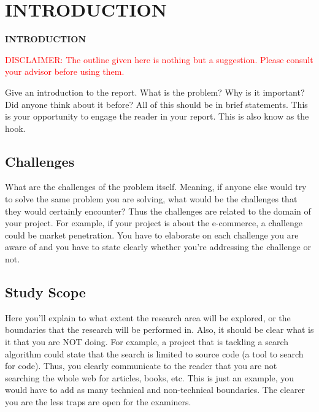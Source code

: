 \chapter{INTRODUCTION}
\pagebreak

\begin{center}
{\LARGE\textbf{INTRODUCTION}}
\end{center}

\textcolor{red}{DISCLAIMER: The outline given here is nothing but a suggestion. Please consult your advisor before using them.}

Give an introduction to the report. What is the problem? Why is it important? Did anyone think about it before? All of this should be in brief statements. This is your opportunity to engage the reader in your report. This is also know as the hook.

\section{Challenges}
\label{sec:challenges}

What are the challenges of the problem itself. Meaning, if anyone else would try to solve the same problem you are solving, what would be the challenges that they would certainly encounter? Thus the challenges are related to the domain of your project. For example, if your project is about the e-commerce, a challenge could be market penetration. You have to elaborate on each challenge you are aware of and you have to state clearly whether you're addressing the challenge or not. 


\section{Study Scope}
\label{sec:study_scope}

Here you'll explain to what extent the research area will be explored, or the boundaries that the research will be performed in. Also, it should be clear what is it that you are NOT doing. For example, a project that is tackling a search algorithm could state that the search is limited to source code (a tool to search for code). Thus, you clearly communicate to the reader that you are not searching the whole web for articles, books, etc. This is just an example, you would have to add as many technical and non-technical boundaries. The clearer you are the less traps are open for the examiners.

